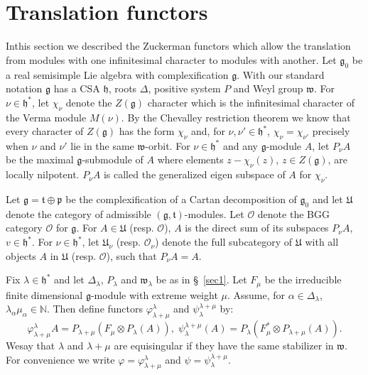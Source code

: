 
\chapter{Translation functors}\label{sec5}


In\pageoriginale this section we described the Zuckerman functors
which allow the translation from modules with one infinitesimal
character to modules with another. Let $\mathfrak{g}_0$ be a real
semisimple Lie algebra with complexification $\mathfrak{g}$. With our
standard notation $\mathfrak{g}$ has a CSA $\mathfrak{h}$, roots
$\Delta$, positive system $P$ and Weyl group $\mathfrak{w}$. For $\nu
\in \mathfrak{h}^*$, let $\chi_\nu$ denote the $Z(\mathfrak{g})$
character which is the infinitesimal character of the Verma module
$M(\nu)$. By the Chevalley restriction theorem we know that every
character of $Z(\mathfrak{g})$ has the form $\chi_\nu$ and, for $\nu,
\nu' \in \mathfrak{h}^*$, $\chi_\nu = \chi_{\nu'}$ precisely when
$\nu$ and $\nu'$ lie in the same $\mathfrak{w}$-orbit. For $\nu \in
\mathfrak{h}^*$ and any $\mathfrak{g}$-module $A$, let $P_\nu A$ be
the maximal $\mathfrak{g}$-submodule of $A$ where elements $z -
\chi_\nu(z)$, $z \in Z(\mathfrak{g})$, are locally nilpotent. $P_\nu
A$ is called the generalized eigen subspace of $A$ for $\chi_\nu$.

Let $\mathfrak{g} = \mathfrak{t} \oplus \mathfrak{p}$ be the
complexification of a Cartan decomposition of $\mathfrak{g}_0$ and let
$\mathfrak{U}$ denote the category of admissible $(\mathfrak{g},
\mathfrak{t})$-modules. Let $\mathscr{O}$ denote the BGG category
$\mathscr{O}$ for $\mathfrak{g}$. For $A \in \mathfrak{U}$
(resp. $\mathscr{O}$), $A$ is the direct sum of its subspaces $P_\nu
A$, $v \in \mathfrak{h}^*$. For $\nu \in \mathfrak{h}^*$, let
$\mathfrak{U}_\nu$ (resp. $\mathscr{O}_\nu$) denote the full
subcategory of $\mathfrak{U}$ with all objects $A$ in $\mathfrak{U}$
(resp. $\mathscr{O}$), such that $P_\nu A = A$. 

Fix $\lambda \in \mathfrak{h}^*$ and let $\Delta_\lambda$, $P_\lambda$
and $\mathfrak{w}_\lambda$ be as in \S\ \ref{sec1}. Let $F_\mu$ be the
irreducible finite dimensional $\mathfrak{g}$-module with extreme
weight $\mu$. Assume, for $\alpha \in \Delta_\lambda$, $\lambda_\alpha
\mu_\alpha \in \mathbb{N}$. Then define functors
$\varphi^{\lambda}_{\lambda + \mu}$ and $\psi^{\lambda+\mu}_{\lambda}$ by:
\begin{equation*}
\varphi^{\lambda}_{\lambda + \mu} A = P_{\lambda + \mu} (F_\mu \otimes
P_\lambda (A)), \; \psi^{\lambda + \mu}_\lambda (A) = P_\lambda
(F^*_\mu \otimes P_{\lambda + \mu} (A)). \tag{5.1}\label{eq5.1}
\end{equation*}
We\pageoriginale say that $\lambda$ and $\lambda + \mu$ are
equisingular if they have the same stabilizer in $\mathfrak{w}$. For
convenience we write $\varphi = \varphi^\lambda_{\lambda + \mu}$ and
$\psi = \psi^{\lambda + \mu}_\lambda$.

